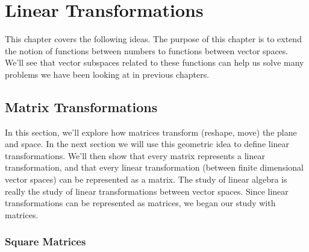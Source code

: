 \chapter{Linear Transformations}

This chapter covers the following ideas. The purpose of this chapter is to extend the notion of functions between numbers to functions between vector spaces.  We'll see that vector subspaces related to these functions can help us solve many problems we have been looking at in previous chapters.



\section{Matrix Transformations}


In this section, we'll explore how matrices transform (reshape, move) the plane and space. 
In the next section we will use this geometric idea to define linear transformations. 
We'll then show that every matrix represents a linear transformation, and that every linear transformation (between finite dimensional vector spaces) can be represented as a matrix.  
The study of linear algebra is really the study of linear transformations between vector spaces. 
Since linear transformations can be represented as matrices, we began our study with matrices.

\subsection{Square Matrices}

